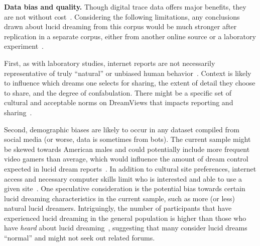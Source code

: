 \documentclass[10pt,a4paper,twocolumn]{article}
\begin{document}
\smallskip
\noindent
\textbf{Data bias and quality.}
Though digital trace data offers major benefits, they are not without cost~\cite{ruths2014,heng2018,rafaeli2019,lazer2020,boegershausen2021}. Considering the following limitations, any conclusions drawn about lucid dreaming from this corpus would be much stronger after replication in a separate corpus, either from another online source or a laboratory experiment~\cite{ruths2014}.

\par
First, as with laboratory studies, internet reports are not necessarily representative of truly ``natural'' or unbiased human behavior~\cite{ruths2014}. Context is likely to influence which dreams one selects for sharing, the extent of detail they choose to share, and the degree of confabulation. There might be a specific set of cultural and acceptable norms on DreamViews that impacts reporting and sharing~\cite{khalid2020,silva2009,ruths2014}.

\par
Second, demographic biases are likely to occur in any dataset compiled from social media (or worse, data is sometimes from bots). The current sample might be skewed towards American males and could potentially include more frequent video gamers than average, which would influence the amount of dream control expected in lucid dream reports~\cite{gackenbach2006,gackenbach2009,sestir2019}. In addition to cultural site preferences, internet access and necessary computer skills limit who is interested and able to use a given site~\cite{ruths2014,hargittai2020}. One speculative consideration is the potential bias towards certain lucid dreaming characteristics in the current sample, such as more (or less) natural lucid dreamers. Intriguingly, the number of participants that have experienced lucid dreaming in the general population is higher than those who have \emph{heard} about lucid dreaming~\cite{neuhausler2018}, suggesting that many consider lucid dreams ``normal'' and might not seek out related forums.
\end{document}
